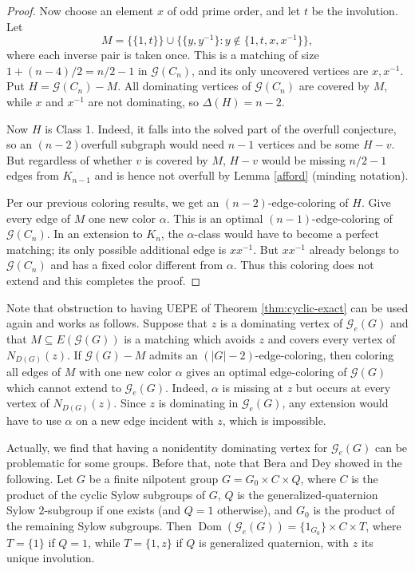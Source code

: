 \documentclass{article}
\theoremstyle{definition}
\theoremstyle{indentclaim}
\theoremstyle{named}
\theoremstyle{named}
\begin{document}
\begin{proof}
Now choose an element $x$ of odd prime order, and let $t$ be the involution.
Let
\[
 M=\bigl\{\{1,t\}\bigr\}
   \cup
   \bigl\{\{y,y^{-1}\}:y\notin\{1,t,x,x^{-1}\}\bigr\},
\]
where each inverse pair is taken once.  This is a matching of size $1 + (n-4)/2 = n/2-1$
in $\mathscr G(C_n)$, and its only uncovered vertices are $x,x^{-1}$.
Put $H=\mathscr G(C_n)-M$.  All dominating vertices of
$\mathscr G(C_n)$ are covered by $M$, while $x$ and $x^{-1}$ are not
dominating, so $\Delta(H)=n-2$.

Now $H$ is Class 1. Indeed, it falls into the solved part of the overfull conjecture, so an $(n-2)$overfull subgraph would need $n-1$ vertices and be some $H-v$. But regardless of whether $v$ is covered by $M$, $H-v$ would be missing $n/2-1$ edges from $K_{n-1}$ and is hence not overfull by Lemma \ref{afford} (minding notation). 

Per our previous coloring results, we get an $(n-2)$-edge-coloring of $H$.
Give every edge of $M$ one new color $\alpha$.  This is an optimal
$(n-1)$-edge-coloring of $\mathscr G(C_n)$.  In an extension to $K_n$, the
$\alpha$-class would have to become a perfect matching; its only possible
additional edge is $xx^{-1}$.  But $xx^{-1}$ already belongs to
$\mathscr G(C_n)$ and has a fixed color different from $\alpha$. Thus this
coloring does not extend and this completes the proof. 
\end{proof}



Note that obstruction to having UEPE of Theorem \ref{thm:cyclic-exact} can be used again and works as follows. Suppose that
$z$ is a dominating vertex of $\mathscr G_e(G)$ and that
$M\subseteq E(\mathscr G(G))$ is a matching which avoids $z$ and
covers every vertex of $N_{D(G)}(z)$. If
$\mathscr G(G)-M$ admits an $(|G|-2)$-edge-coloring, then coloring
all edges of $M$ with one new color $\alpha$ gives an optimal
edge-coloring of $\mathscr G(G)$ which cannot extend to
$\mathscr G_e(G)$. Indeed, $\alpha$ is missing at $z$ but occurs at
every vertex of $N_{D(G)}(z)$. Since $z$ is dominating in
$\mathscr G_e(G)$, any extension would have to use $\alpha$ on a
new edge incident with $z$, which is impossible. 

\medskip

Actually, we find that having a nonidentity dominating vertex for $\mathscr{G}_e(G)$ can be problematic for some groups. Before that, note that Bera and Dey showed in \cite{BeraDey2022} the following. Let $G$ be a finite nilpotent group $G=G_0\times C\times Q$,
where $C$ is the product of the cyclic Sylow subgroups of $G$, $Q$ is the
generalized-quaternion Sylow $2$-subgroup if one exists (and $Q=1$
otherwise), and $G_0$ is the product of the remaining Sylow subgroups.
Then $\operatorname{Dom}(\mathscr G_e(G))
=
\{1_{G_0}\}\times C\times T$,
where $T=\{1\}$ if $Q=1$, while $T=\{1,z\}$ if $Q$ is generalized
quaternion, with $z$ its unique involution.
\end{document}
